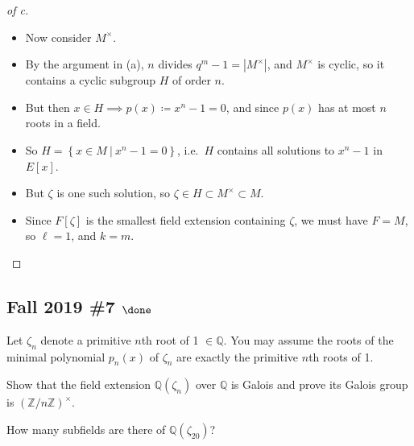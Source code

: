 \begin{solution}
\begin{proof}[of c]
\begin{itemize}
  so \(M\) is a degree \(m\) extension of \(E\).
\item
  Now consider \(M^{\times}\).
\item
  By the argument in (a), \(n\) divides
  \(q^m - 1 = {\left\lvert {M^{\times}} \right\rvert}\), and
  \(M^{\times}\) is cyclic, so it contains a cyclic subgroup \(H\) of
  order \(n\).
\item
  But then \(x\in H \implies p(x)\coloneqq x^n-1 = 0\), and since
  \(p(x)\) has at most \(n\) roots in a field.
\item
  So \(H = \left\{{x \in M {~\mathrel{\Big|}~}x^n-1 = 0}\right\}\),
  i.e.~\(H\) contains all solutions to \(x^n-1\) in \(E[x]\).
\item
  But \(\zeta\) is one such solution, so
  \(\zeta \in H \subset M^{\times}\subset M\).
\item
  Since \(F[\zeta]\) is the smallest field extension containing
  \(\zeta\), we must have \(F = M\), so \(\ell = 1\), and \(k = m\).
\end{itemize}

\end{proof}

\end{solution}

\hypertarget{fall-2019-7-done}{%
\subsection{\texorpdfstring{Fall 2019 \#7
\(\done\)}{Fall 2019 \#7 \textbackslash done}}\label{fall-2019-7-done}}

Let \(\zeta_n\) denote a primitive \(n\)th root of 1
\(\in {\mathbb{Q}}\). You may assume the roots of the minimal polynomial
\(p_n(x)\) of \(\zeta_n\) are exactly the primitive \(n\)th roots of 1.

Show that the field extension \({\mathbb{Q}}(\zeta_n )\) over
\({\mathbb{Q}}\) is Galois and prove its Galois group is
\(({\mathbb{Z}}/n{\mathbb{Z}})^{\times}\).

How many subfields are there of \({\mathbb{Q}}(\zeta_{20} )\)?

